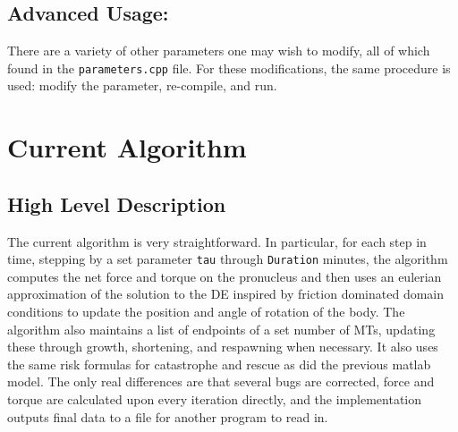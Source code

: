 \documentclass{article}
\begin{document}
  \subsection{Advanced Usage:}
  There are a variety of other parameters one may wish to modify, all of which
  found in the \texttt{parameters.cpp} file. For these modifications, the same
  procedure is used: modify the parameter, re-compile, and run. 
\section{Current Algorithm}
\subsection{High Level Description}
The current algorithm is very straightforward. In particular, for each step in
time, stepping by a set parameter \texttt{tau} through \texttt{Duration}
minutes, the algorithm computes the net force and torque on the pronucleus and
then uses an eulerian approximation of the solution to the DE inspired by
friction dominated domain conditions to update the position and angle of
rotation of the body. The algorithm also maintains a list of endpoints of a set
number of MTs, updating these through growth, shortening, and respawning when
necessary. It also uses the same risk formulas for catastrophe and rescue as did
the previous matlab model. The only real differences are that several bugs are
corrected, force and torque are calculated upon every iteration directly, and
the implementation outputs final data to a file for another program to read in. 
\end{document}
